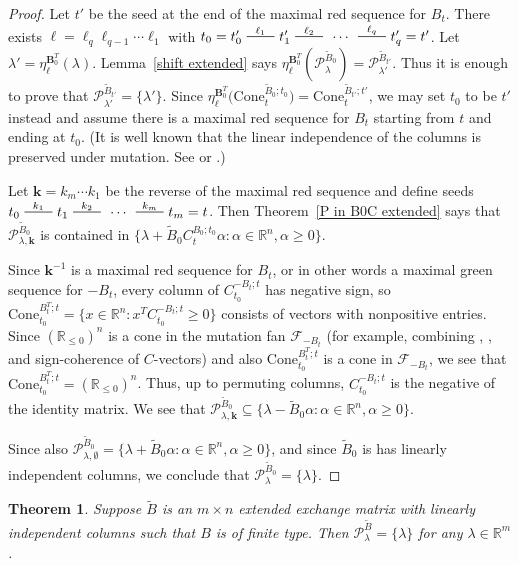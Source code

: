 \documentclass{amsart}
\newtheorem{theorem}[proposition]{Theorem}
\theoremstyle{definition}
\theoremstyle{remark}
\numberwithin{equation}{section}
\newcommand{\reals}{\mathbb R}
\newcommand{\edge}{\,\,\rule[2.7pt]{20pt}{0.5pt}\,\,}
\newcommand{\set}[1]{{\lbrace #1 \rbrace}}
\newcommand{\F}{{\mathcal F}}
\newcommand{\0}{{\mathbf{0}}}
\newcommand{\Cone}{\mathrm{Cone}}
\newcommand{\kk}{{\boldsymbol{k}}}
\renewcommand{\ll}{{\boldsymbol\ell}}
\newcommand{\tB}{{\tilde{B}}}
\newcommand{\BB}{\mathbf{B}}
\renewcommand{\P}{\mathcal{P}}
\begin{document}
\begin{proof}%
Let $t'$ be the seed at the end of the maximal red sequence for $B_t$.
There exists $\ll=\ell_q\ell_{q-1}\cdots\ell_1$ with $t_0=t'_0\overset{\ell_1}{\edge}t'_1\overset{\ell_2}{\edge}\,\cdots\,\overset{\ell_q}{\edge}t'_q=t'$.
Let $\lambda'=\eta^{\BB_0^T}_\ll\!(\lambda)$.
Lemma~\ref{shift extended} says $\eta^{\BB_0^T}_\ll\!(\P^{\tB_0}_\lambda)=\P^{\tB_{t'}}_{\lambda'}$.
Thus it is enough to prove that $\P^{\tB_{t'}}_{\lambda'}=\set{\lambda'}$.
Since $\eta_\ll^{\BB_0^T}\bigl(\Cone_t^{\tB_0;t_0}\bigr)=\Cone_t^{\tB_{t'};t'}$, we may set $t_0$ to be $t'$ instead and assume there is a maximal red sequence for $B_t$ starting from $t$ and ending at $t_0$.
(It is well known that the linear independence of the columns is preserved under mutation.
See \cite[Lemma~1.2]{GSV03} or \cite[Lemma~3.2]{ca3}.)

Let $\kk=k_m\cdots k_1$ be the reverse of the maximal red sequence and define seeds $t_0\overset{k_1}{\edge}t_1\overset{k_2}{\edge}\,\cdots\,\overset{k_m}{\edge}t_m=t$.
Then Theorem~\ref{P in B0C extended} says that $\P^{\tB_0}_{\lambda,\kk}$ is contained in $\set{\lambda+\tB_0C_t^{B_0;t_0}\alpha:\alpha\in\reals^n,\alpha\ge0}$.

Since $\kk^{-1}$ is a maximal red sequence for $B_t$, or in other words a maximal green sequence for $-B_t$, every column of $C_{t_0}^{-B_t;t}$ has negative sign, so $\Cone_{t_0}^{B_t^T;t}=\set{x\in\reals^n:x^TC_{t_0}^{-B_t;t}\ge0}$ consists of vectors with nonpositive entries.
Since $\left(\reals_{\le0}\right)^n$ is a cone in the mutation fan $\F_{-B_t}$ (for example, combining \mbox{\cite[Proposition~7.1]{universal}}, \mbox{\cite[Proposition~8.9]{universal}}, and sign-coherence of $C$-vectors) and also $\Cone_{t_0}^{B_t^T;t}$ is a cone in $\F_{-B_t}$, we see that $\Cone_{t_0}^{B_t^T;t}=\left(\reals_{\le0}\right)^n$.
Thus, up to permuting columns, $C_{t_0}^{-B_t;t}$ is the negative of the identity matrix.
We see that $\P^{\tB_0}_{\lambda,\kk}\subseteq\set{\lambda-\tB_0\alpha:\alpha\in\reals^n,\alpha\ge0}$.

Since also $\P^{\tB_0}_{\lambda,\emptyset}=\set{\lambda+\tB_0\alpha:\alpha\in\reals^n,\alpha\ge0}$, and since $\tB_0$ is has linearly independent columns, we conclude that $\P^{\tB_0}_\lambda=\set{\lambda}$.
\end{proof}

\begin{theorem}\label{finite P point indep}  
Suppose $\tB$ is an $m\times n$ extended exchange matrix with linearly independent columns such that $B$ is of finite type.
Then $\P^\tB_\lambda=\set{\lambda}$ for any $\lambda\in\reals^m$.
\end{theorem}
\end{document}
